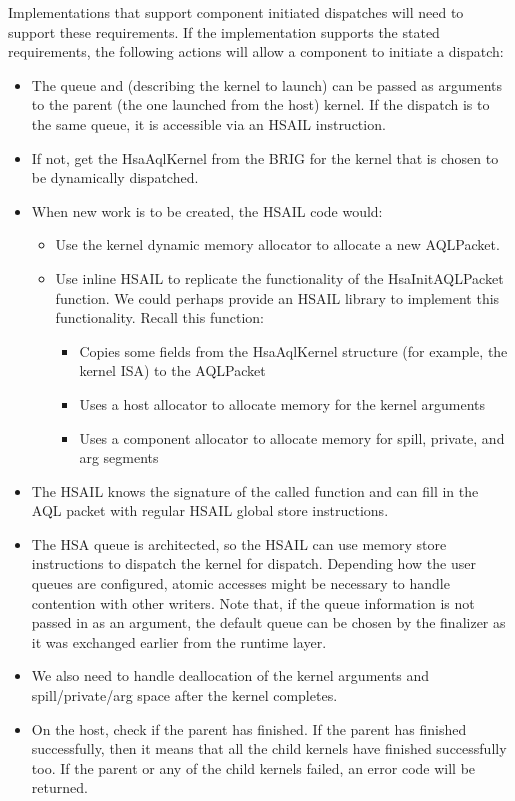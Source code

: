 \documentclass[final]{book}
\begin{document}
Implementations that support component initiated dispatches will need to support
these requirements. If the implementation supports the stated requirements, the
following actions will allow a component to initiate a dispatch:
\begin{itemize}
\item The queue and  (describing the kernel to
  launch) can be passed as arguments to the parent (the one launched from the
  host) kernel. If the dispatch is to the same queue, it is accessible via an
  HSAIL instruction.
\item If not, get the Hsa\-Aql\-Kernel from the BRIG for the kernel that is
  chosen to be dynamically dispatched.
\item When new work is to be created, the HSAIL code would:
\begin{itemize}
\item Use the kernel dynamic memory allocator to allocate a new AQL\-Packet.
\item Use inline HSAIL to replicate the functionality of the
  Hsa\-Init\-AQL\-Packet function. We could perhaps provide an HSAIL library to
  implement this functionality. Recall this function:
\begin{itemize}
\item Copies some fields from the Hsa\-Aql\-Kernel structure (for example, the
  kernel ISA) to the AQL\-Packet
\item Uses a host allocator to allocate memory for the kernel arguments
\item Uses a component allocator to allocate memory for spill, private, and arg
  segments
\end{itemize}
\end{itemize}
\item The HSAIL knows the signature of the called function and can fill in the
  AQL packet with regular HSAIL global store instructions.
\item The HSA queue is architected, so the HSAIL can use memory store
  instructions to dispatch the kernel for dispatch. Depending how the user
  queues are configured, atomic accesses might be necessary to handle contention
  with other writers. Note that, if the queue information is not passed in as an
  argument, the default queue can be chosen by the finalizer as it was exchanged
  earlier from the runtime layer.
\item We also need to handle deallocation of the kernel arguments and
  spill/private/arg space after the kernel completes.
\item On the host, check if the parent has finished. If the parent has finished
  successfully, then it means that all the child kernels have finished
  successfully too. If the parent or any of the child kernels failed, an error
  code will be returned.
\end{itemize}
\end{document}

